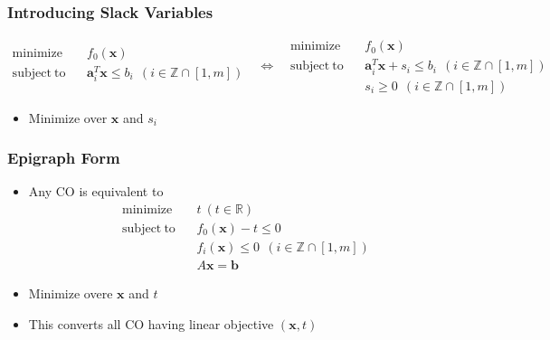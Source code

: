 \subsubsection*{Introducing Slack Variables}
\begin{equation}\begin{aligned}
    \mathrm{minimize}~~&~~f_0(\mathbf{x}) \\
    \mathrm{subject~to}~~&~~\mathbf{a}_i^T \mathbf{x} \leq b_i~~(i \in \mathbb{Z} \cap [1,m]) \\ {}
\end{aligned}~~~\Leftrightarrow~~~\begin{aligned}
    \mathrm{minimize}~~&~~f_0(\mathbf{x}) \\
    \mathrm{subject~to}~~&~~\mathbf{a}_i^T \mathbf{x} + s_i \leq b_i~~(i \in \mathbb{Z} \cap [1,m]) \\
        &~~ s_i \geq 0~~(i \in \mathbb{Z} \cap [1,m])
\end{aligned}\end{equation}
\begin{itemize}
    \item Minimize over $\mathbf{x}$ and $s_i$
\end{itemize}

\subsubsection*{Epigraph Form}
\begin{itemize}
    \item Any CO is equivalent to
    \begin{equation}\begin{aligned}
        \mathrm{minimize}~~&~~t~(t \in \mathbb{R}) \\
        \mathrm{subject~to}~~&~~f_0(\mathbf{x}) - t \leq 0 \\
            &~~f_i(\mathbf{x}) \leq 0~~(i \in \mathbb{Z} \cap [1,m]) \\
            &~~ A\mathbf{x} = \mathbf{b}
    \end{aligned}\end{equation}
    \item Minimize overe $\mathbf{x}$ and $t$
    \item This converts all CO having linear objective $(\mathbf{x}, t)$
\end{itemize}

